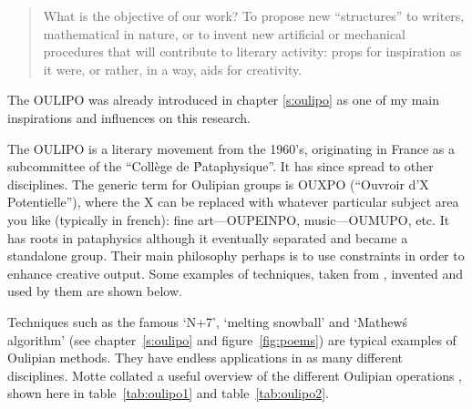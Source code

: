 \begin{quotation}
  What is the objective of our work? To propose new ``structures'' to writers, mathematical in nature, or to invent new artificial or mechanical procedures that will contribute to literary activity: props for inspiration as it were, or rather, in a way, aids for creativity. 
\end{quotation}

The \acf{OULIPO} was already introduced in chapter \ref{s:oulipo} as one of my main inspirations and influences on this research.

The \ac{OULIPO} is a literary movement from the 1960's, originating in France as a subcommittee of the ``Coll\`{e}ge de \'Pataphysique''. It has since spread to other disciplines. The generic term for Oulipian groups is OUXPO (``Ouvroir d'X Potentielle''), where the X can be replaced with whatever particular subject area you like (typically in french): fine art---OUPEINPO, music---OUMUPO, etc. It has roots in pataphysics although it eventually separated and became a standalone group. Their main philosophy perhaps is to use constraints in order to enhance creative output. Some examples of techniques, taken from \autocite{Mathews2005}, invented and used by them are shown below.

Techniques such as the famous `N+7', `melting snowball' and `Mathew\'s algorithm' (see chapter~\ref{s:oulipo} and figure~\ref{fig:poems}) are typical examples of Oulipian methods. They have endless applications in as many different disciplines. Motte collated a useful overview of the different Oulipian operations \autocite*{Motte2007}, shown here in table~\ref{tab:oulipo1} and table~\ref{tab:oulipo2}.

